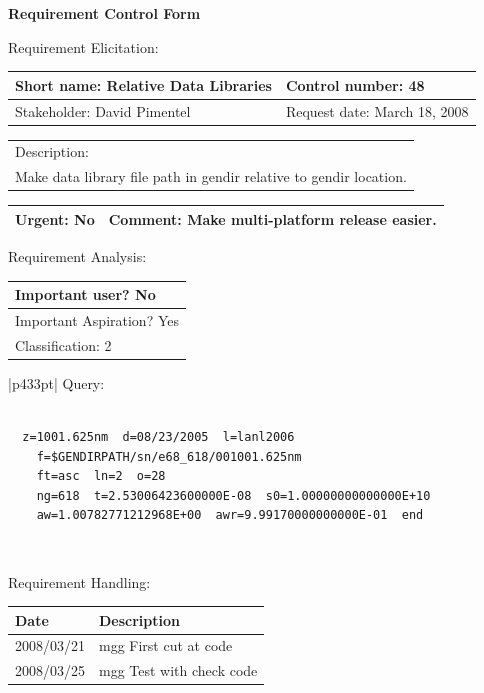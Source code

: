 \begin{center}\Large\bf
Requirement Control Form
\end{center}
\vspace{24pt}

Requirement Elicitation:

\begin{tabular}{|p{211pt}|p{211pt}|} \hline
Short name: Relative Data Libraries & Control number: 48\\ \hline
Stakeholder: David Pimentel & Request date: March 18, 2008\\
\end{tabular}
\begin{tabular}{|p{433pt}|} \hline
Description: \\ 
Make data library file path in gendir relative to gendir location.\\ 
\hline
\end{tabular} 
\begin{tabular}{|p{211pt}|p{211pt}|} \hline
Urgent: No & Comment: Make multi-platform release easier.\\ \hline
\end{tabular}

\vspace{24pt}

Requirement Analysis:

\begin{tabular}{|p{433pt}|} \hline
Important user? No \\ \hline
Important Aspiration? Yes \\ \hline
Classification: 2 \\ \hline
\end{tabular}

\vspace{12pt}

\begin{tabular}{|p{433pt}|} \hline
Query:
\begin{verbatim}

  z=1001.625nm  d=08/23/2005  l=lanl2006
    f=$GENDIRPATH/sn/e68_618/001001.625nm
    ft=asc  ln=2  o=28
    ng=618  t=2.53006423600000E-08  s0=1.00000000000000E+10
    aw=1.00782771212968E+00  awr=9.99170000000000E-01  end

\end{verbatim}
\\ \hline

\end{tabular}

\vspace{24pt}

Requirement Handling:

\begin{tabular}{|p{72pt}|p{351pt}|} \hline
Date & Description \\ \hline
2008/03/21 & mgg First cut at code \\ \hline
2008/03/25 & mgg Test with check code \\ \hline
\end{tabular}
